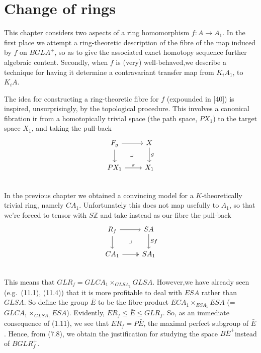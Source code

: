 \documentclass[openany,leqno]{book}  %
\newcommand{\Z}{\mathbb{Z}}
\begin{document}
\chapter{Change of rings} %
\label{cha:12change_of_rings}
This chapter considers two aspects of a ring homomorphism $f \colon   A \longrightarrow A_1$. In the first place we attempt a ring-theoretic description of the fibre of the map induced by $f$ on $BGLA^+$, so as to give the associated exact homotopy sequence further algebraic content. Secondly, when $f$ is (very) well-behaved,we describe a technique for having it determine a contravariant transfer map from $K_iA_1$, to $K_iA$.

The idea for constructing a ring-theoretic fibre for $f$ (expounded in [40]) is inspired, unsurprisingly, by the topological procedure. This involves a canonical fibration ir from a homotopically trivial space (the path space, $PX_1$) to the target space $X_1$, and taking the pull-back
\[
\begin{tikzcd}
F_g \arrow{r} \arrow{d} \arrow[dr, phantom, "\lrcorner"] & X \arrow{d}{g}\\
PX_1 \arrow{r}{\pi} & X_1 \\
\end{tikzcd}
\]
In the previous chapter we obtained a convincing model for a $K$-theoretically trivial ring, namely $CA_1$. Unfortunately this does not map usefully to $A_1$, so that we're forced to tensor with $S\Z$ and take instead as our fibre the pull-back
\[
\begin{tikzcd}
R_f \arrow{r} \arrow{d} \arrow[dr, phantom, "\lrcorner"] & SA \arrow{d}{Sf}\\
CA_1 \arrow[two heads]{r} & SA_1 \\
\end{tikzcd}
\]
This means that $GLR_f = GLCA_1 \times_{GLSA_1}GLSA$. However,we have already seen (e.g.\  (11.1),
(11.4)) that it is more profitable to deal with $ESA$ rather than $GLSA$. So define the group $\bar{E}$ to be the fibre-product $ECA_1\times_{ESA_1}  ESA$ (= $GLCA_1 \times_{GLSA_1} ESA$). Evidently, $ER_f \leqslant \bar{E} \leqslant GLR_f$. So, as an immediate consequence of (1.11), we see that $ER_f = P\bar{E}$, the maximal perfect subgroup of $\bar{ E}$. Hence, from (7.8), we obtain the justification for studying the space $B\bar{E}^+$instead of $BGLR_f^+$.
\end{document}
